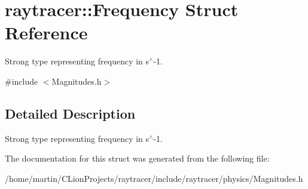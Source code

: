 \hypertarget{structraytracer_1_1Frequency}{}\section{raytracer\+:\+:Frequency Struct Reference}
\label{structraytracer_1_1Frequency}


Strong type representing frequency in s$^\wedge$-\/1.  




{\ttfamily \#include $<$Magnitudes.\+h$>$}



\subsection{Detailed Description}
Strong type representing frequency in s$^\wedge$-\/1. 



The documentation for this struct was generated from the following file\+:\begin{DoxyCompactItemize}
\item 
/home/martin/\+C\+Lion\+Projects/raytracer/include/raytracer/physics/Magnitudes.\+h\end{DoxyCompactItemize}
